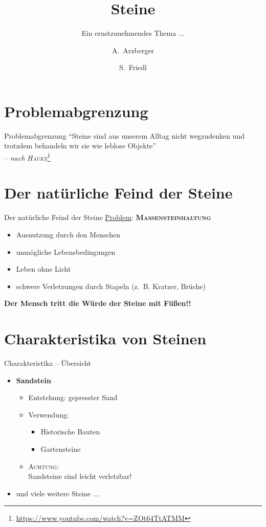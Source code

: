 \documentclass[11pt]{beamer}
\title{Steine}
\subtitle{Ein ernstzunehmendes Thema ...}
\author{A.~Arzberger \and S.~Friedl}
\institute[IaHS]{Institut für artgerechte Haltung von Steinen, Gräfenberg}
\begin{document}
	\frame{\maketitle}
	
	
	\section{Problemabgrenzung}
	\begin{frame}{Problemabgrenzung}
		\enquote{Steine sind aus unserem Alltag nicht wegzudenken und trotzdem behandeln wir sie wie leblose Objekte} \\
		-- \textit{nach \textsc{Hauke}}\footnote{\url{https://www.youtube.com/watch?v=ZOt64TtATMM}}
	\end{frame}


	\section[Natürlicher Feind]{Der natürliche Feind der Steine}
	\begin{frame}{Der natürliche Feind der Steine}
		\underline{Problem}:\hspace{1em} \textbf{\textsc{Massensteinhaltung}}
		\begin{itemize}
			\item Ausnutzung durch den Menschen
			\item unmögliche Lebensbedingungen
			\item Leben ohne Licht
			\item schwere Verletzungen durch Stapeln (z.~B. Kratzer, Brüche)
		\end{itemize}
		
		\bigskip
		
		\textbf{Der Mensch tritt die Würde der Steine mit Füßen!!}
	\end{frame}


	\section[Charakteristika]{Charakteristika von Steinen}
	\begin{frame}{Charakteristika -- Übersicht}
		\begin{itemize}
			\item \textbf{Sandstein}
					\begin{itemize}
						\item Entstehung: gepresster Sand
						\item Verwendung:
								\begin{itemize}
									\item Historische Bauten
									\item Gartensteine
								\end{itemize}
						\item \textsc{Achtung:} \\
							  Sandsteine sind leicht verletzbar!
					\end{itemize}
			\item und viele weitere Steine ...
		\end{itemize}
	\end{frame}
\end{document}
